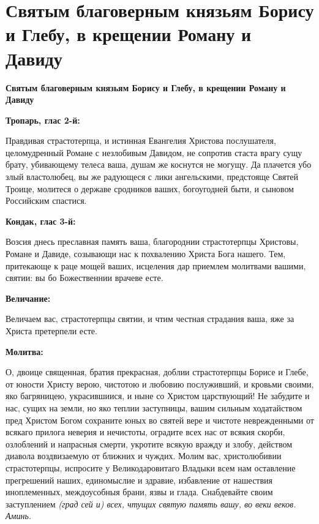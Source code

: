 \section{Святым благоверным князьям Борису и Глебу, в крещении Роману и  Давиду}
 

\bfseries Святым благоверным князьям Борису и Глебу, в крещении Роману и Давиду\normalfont{}


\medskip


\bfseries Тропарь, глас 2-й:\normalfont{}


Правдивая страстотерпца, и истинная Евангелия Христова послушателя, целомудренный Романе с незлобивым Давидом, не сопротив стаста врагу сущу брату, убивающему телеса ваша, душам же коснутся не могущу. Да плачется убо злый властолюбец, вы же радующеся с лики ангельскими, предстояще Святей Троице, молитеся о державе сродников ваших, богоугодней быти, и сыновом Российским спастися.


\medskip


\bfseries Кондак, глас 3-й:\normalfont{}


Возсия днесь преславная память ваша, благороднии страстотерпцы Христовы, Романе и Давиде, созывающи нас к похвалению Христа Бога нашего. Тем, притекающе к раце мощей ваших, исцеления дар приемлем молитвами вашими, святии: вы бо Божественнии врачеве есте.


\medskip


\bfseries Величание:\normalfont{}


Величаем вас, страстотерпцы святии, и чтим честная страдания ваша, яже за Христа претерпели есте.


\medskip


\bfseries Молитва:\normalfont{}


О, двоице священная, братия прекрасная, доблии страстотерпцы Борисе и Глебе, от юности Христу верою, чистотою и любовию послуживший, и кровьми своими, яко багряницею, украсившиися, и ныне со Христом царствующий! Не забудите и нас, сущих на земли, но яко теплии заступницы, вашим сильным ходатайством пред Христом Богом сохраните юных во святей вере и чистоте неврежденными от всякаго прилога неверия и нечистоты, оградите всех нас от всякия скорби, озлоблений и напрасныя смерти, укротите всякую вражду и злобу, действом диавола воздвизаемую от ближних и чуждих. Молим вас, христолюбивии страстотерпцы, испросите у Великодаровитаго Владыки всем нам оставление прегрешений наших, единомыслие и здравие, избавление от нашествия иноплеменных, междоусобныя брани, язвы и глада. Снабдевайте своим заступлением \itshape (град сей и)\normalfont{} всех, чтущих святую память вашу, во веки веков. Аминь.


